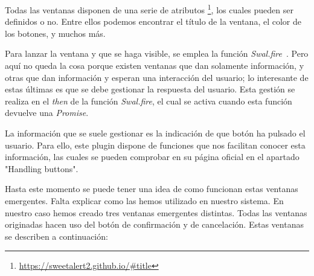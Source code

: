 Todas las ventanas disponen de una serie de atributos \footnote{\url{https://sweetalert2.github.io/#title}}, los cuales pueden ser definidos o no. Entre ellos podemos encontrar el título de la ventana, el color de los botones, y muchos más.

Para lanzar la ventana y que se haga visible, se emplea la función \textit{Swal.fire}\ . Pero aquí no queda la cosa porque existen ventanas que dan solamente información, y otras que dan información y esperan una interacción del usuario; lo interesante de estas últimas es que se debe gestionar la respuesta del usuario. Esta gestión se realiza en el \textit{then} de la función \textit{Swal.fire}, el cual se activa cuando esta función devuelve una \textit{Promise}.

La información que se suele gestionar es la indicación de que botón ha pulsado el usuario. Para ello, este plugin dispone de funciones que nos facilitan conocer esta información, las cuales se pueden comprobar en su página oficial en el apartado "Handling buttons".

Hasta este momento se puede tener una idea de como funcionan estas ventanas emergentes. Falta explicar como las hemos utilizado en nuestro sistema. En nuestro caso hemos creado tres ventanas emergentes distintas. Todas las ventanas originadas hacen uso del botón de confirmación y de cancelación. Estas ventanas se describen a continuación:

